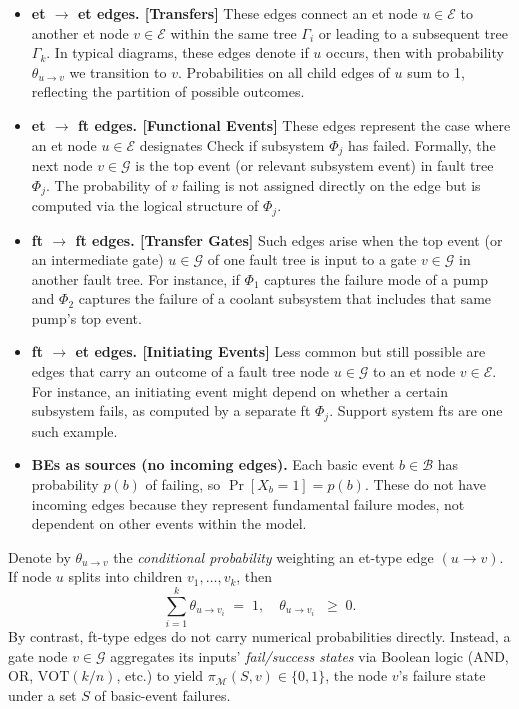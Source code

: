 \begin{itemize}
\item \textbf{\acrshort{et} \(\to\) \acrshort{et} edges. [Transfers]}  These edges connect an \acrshort{et} node \(u\in\mathcal{E}\) to another \acrshort{et} node \(v\in\mathcal{E}\) within the same tree \(\Gamma_i\) or leading to a subsequent tree \(\Gamma_{k}\).  In typical diagrams, these edges denote if \(u\) occurs, then with probability \(\theta_{u\to v}\) we transition to \(v\).  Probabilities on all child edges of \(u\) sum to 1, reflecting the partition of possible outcomes.

\item \textbf{\acrshort{et} \(\to\) \acrshort{ft} edges. [Functional Events]}  These edges represent the case where an \acrshort{et} node \(u\in\mathcal{E}\) designates Check if subsystem \(\Phi_j\) has failed.  Formally, the next node \(v\in\mathcal{G}\) is the top event (or relevant subsystem event) in fault tree \(\Phi_j\).  The probability of \(v\) failing is not assigned directly on the edge but is computed via the logical structure of \(\Phi_j\).  

\item \textbf{\acrshort{ft} \(\to\) \acrshort{ft} edges. [Transfer Gates]}  Such edges arise when the top event (or an intermediate gate) \(u\in\mathcal{G}\) of one fault tree is input to a gate \(v\in\mathcal{G}\) in another fault tree.  For instance, if \(\Phi_{1}\) captures the failure mode of a pump and \(\Phi_{2}\) captures the failure of a coolant subsystem that includes that same pump’s top event.  

\item \textbf{\acrshort{ft} \(\to\) \acrshort{et} edges. [Initiating Events]}  Less common but still possible are edges that carry an outcome of a fault tree node \(u\in\mathcal{G}\) to an \acrshort{et} node \(v\in\mathcal{E}\).  For instance, an initiating event might depend on whether a certain subsystem fails, as computed by a separate \acrshort{ft} \(\Phi_j\). Support system \acrshort{ft}s are one such example.

\item \textbf{BEs as sources (no incoming edges).}  Each basic event \(b\in\mathcal{B}\) has probability \(p(b)\) of failing, so \(\Pr[X_b=1]\!=\!p(b)\).  These do not have incoming edges because they represent fundamental failure modes, not dependent on other events within the model.  
\end{itemize}
Denote by \(\theta_{u\to v}\) the \emph{conditional probability} weighting an \acrshort{et}-type edge \((u\!\to\!v)\).  If node \(u\) splits into children \(v_1,\dots,v_k\), then
\[
\sum_{i=1}^k \theta_{u \to v_i} \;=\; 1,
\quad
\theta_{u \to v_i}\;\; \ge\;0.
\]
By contrast, \acrshort{ft}-type edges do not carry numerical probabilities directly.  Instead, a gate node \(v\in \mathcal{G}\) aggregates its inputs’ \emph{fail/success states} via Boolean logic (AND, OR, \(\mathrm{VOT}(k/n)\), etc.) to yield \(\pi_{\mathcal{M}}(S,v)\in\{0,1\}\), the node \(v\)’s failure state under a set \(S\) of basic-event failures.

